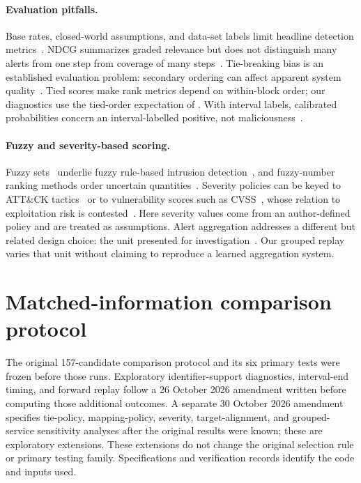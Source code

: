 \documentclass[pdflatex,sn-basic,Numbered]{sn-jnl}
\begin{document}
\paragraph{Evaluation pitfalls.} Base rates, closed-world assumptions, and data-set labels limit headline detection metrics~\citep{Axelsson2000BaseRate,SommerPaxson2010ClosedWorld,Ring2019NIDSDatasets}. NDCG summarizes graded relevance but does not distinguish many alerts from one step from coverage of many steps~\citep{Jarvelin2002NDCG}. Tie-breaking bias is an established evaluation problem: secondary ordering can affect apparent system quality~\citep{Cabanac2010TieBias}. Tied scores make rank metrics depend on within-block order; our diagnostics use the tied-order expectation of \citet{McSherryNajork2008TiedScores}. With interval labels, calibrated probabilities concern an interval-labelled positive, not maliciousness~\citep{ZadroznyElkan2002Calibration,NiculescuMizilCaruana2005Calibration,Guo2017Calibration}.

\paragraph{Fuzzy and severity-based scoring.} Fuzzy sets~\citep{Zadeh1965FuzzySets} underlie fuzzy rule-based intrusion detection~\citep{Tsang2007FuzzyIDS}, and fuzzy-number ranking methods order uncertain quantities~\citep{Chen1985FuzzyRanking}. Severity policies can be keyed to ATT\&CK tactics~\citep{MITREAttack} or to vulnerability scores such as CVSS~\citep{FIRSTCVSS40}, whose relation to exploitation risk is contested~\citep{Allodi2014CVSSExploits,Jacobs2020ExploitPrediction}. Here severity values come from an author-defined policy and are treated as assumptions. Alert aggregation addresses a different but related design choice: the unit presented for investigation~\citep{Landauer2022Aggregation}. Our grouped replay varies that unit without claiming to reproduce a learned aggregation system.

\section{Matched-information comparison protocol}
\label{sec:protocol}

The original 157-candidate comparison protocol and its six primary tests were frozen before those runs. Exploratory identifier-support diagnostics, interval-end timing, and forward replay follow a 26 October 2026 amendment written before computing those additional outcomes. A separate 30 October 2026 amendment specifies tie-policy, mapping-policy, severity, target-alignment, and grouped-service sensitivity analyses after the original results were known; these are exploratory extensions. These extensions do not change the original selection rule or primary testing family. Specifications and verification records identify the code and inputs used.
\end{document}
